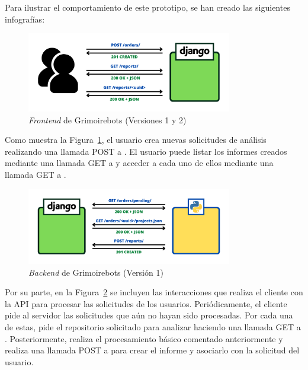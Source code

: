 Para ilustrar el comportamiento de este prototipo, se han creado las siguientes infografías:

\begin{figure}[ht]
    \centering
    \includegraphics[width=0.8\textwidth]{Figures/grimoirebots_frontend}
    \decoRule
    \caption[Grimoirebots (\emph{Frontend})]{\emph{Frontend} de Grimoirebots (Versiones 1 y 2)}
    \label{fig:grimoirebots_frontend}
\end{figure}

Como muestra la Figura~\ref{fig:grimoirebots_frontend}, el usuario crea nuevas solicitudes de análisis realizando una llamada POST a . El usuario puede listar los informes creados mediante una llamada GET a  y acceder a cada uno de ellos mediante una llamada GET a .

\begin{figure}[ht]
    \centering
    \includegraphics[width=0.8\textwidth]{Figures/grimoirebots_i_backend}
    \decoRule
    \caption[Grimoirebots I (\emph{Backend})]{\emph{Backend} de Grimoirebots (Versión 1)}
    \label{fig:grimoirebots_i_backend}
\end{figure}

Por su parte, en la Figura~\ref{fig:grimoirebots_i_backend} se incluyen las interacciones que realiza el cliente con la API para procesar las solicitudes de los usuarios. Periódicamente, el cliente pide al servidor las solicitudes que aún no hayan sido procesadas. Por cada una de estas, pide el repositorio solicitado para analizar haciendo una llamada GET a . Posteriormente, realiza el procesamiento básico comentado anteriormente y realiza una llamada POST a  para crear el informe y asociarlo con la solicitud del usuario.

